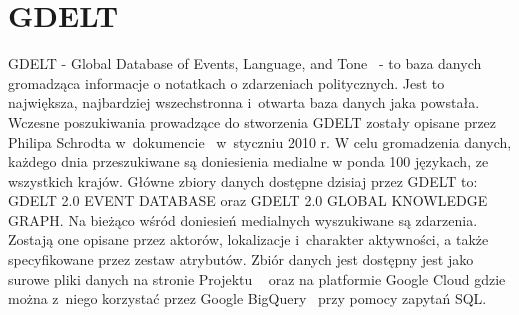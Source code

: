 \documentclass[11pt]{report}
\begin{document}
    \section{GDELT}\label{sec:gdelt}
    GDELT - Global Database of Events, Language, and Tone~\cite{gdelt} - to baza danych gromadząca informacje o notatkach o zdarzeniach politycznych.
    Jest to największa, najbardziej wszechstronna i~otwarta baza danych jaka powstała.
    Wczesne poszukiwania prowadzące do stworzenia GDELT zostały opisane przez Philipa Schrodta w~dokumencie~\cite{Schrodt2010} w~styczniu 2010 r.
    W celu gromadzenia danych, każdego dnia przeszukiwane są doniesienia medialne w ponda 100 językach, ze wszystkich krajów.
    Główne zbiory danych dostępne dzisiaj przez GDELT to:
    GDELT 2.0 EVENT DATABASE oraz
    GDELT 2.0 GLOBAL KNOWLEDGE GRAPH\@.
    Na bieżąco wśród doniesień medialnych wyszukiwane są zdarzenia.
    Zostają one opisane przez aktorów, lokalizacje i~charakter aktywności, a także specyfikowane przez zestaw atrybutów.
    Zbiór danych jest dostępny jest jako surowe pliki danych na stronie Projektu ~\cite{gdelt}
    oraz na platformie Google Cloud gdzie można z~niego korzystać przez Google BigQuery~\cite{BigQuery2014} przy pomocy zapytań SQL\@.
\end{document}

